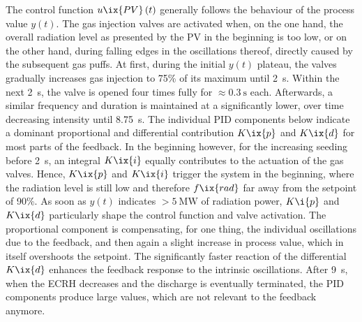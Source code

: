             The control function $u\ix{PV}\left(t\right)$ generally follows the behaviour of the process value $y\left(t\right)$. The gas injection valves are activated when, on the one hand, the overall radiation level as presented by the PV in the beginning is too low, or on the other hand, during falling edges in the oscillations thereof, directly caused by the subsequent gas puffs. At first, during the initial $y\left(t\right)$ plateau, the valves gradually increases gas injection to 75\% of its maximum until \SI{2}{\second}. Within the next \SI{2}{\second}, the valve is opened four times fully for $\approx\SI{0.3}{\second}$ each. Afterwards, a similar frequency and duration is maintained at a significantly lower, over time decreasing intensity until \SI{8.75}{\second}. The individual PID components below indicate a dominant proportional and differential contribution $K\ix{p}$ and $K\ix{d}$ for most parts of the feedback. In the beginning however, for the increasing seeding before \SI{2}{\second}, an integral $K\ix{i}$ equally contributes to the actuation of the gas valves. Hence, $K\ix{p}$ and $K\ix{i}$ trigger the system in the beginning, where the radiation level is still low and therefore $f\ix{rad}$ far away from the setpoint of 90\%. As soon as $y\left(t\right)$ indicates $>\SI{5}{\mega\watt}$ of radiation power, $K\i{p}$ and $K\ix{d}$ particularly shape the control function and valve activation. The proportional component is compensating, for one thing, the individual oscillations due to the feedback, and then again a slight increase in process value, which in itself overshoots the setpoint. The significantly faster reaction of the differential $K\ix{d}$ enhances the feedback response to the intrinsic oscillations. After \SI{9}{\second}, when the ECRH decreases and the discharge is eventually terminated, the PID components produce large values, which are not relevant to the feedback anymore.\\%

